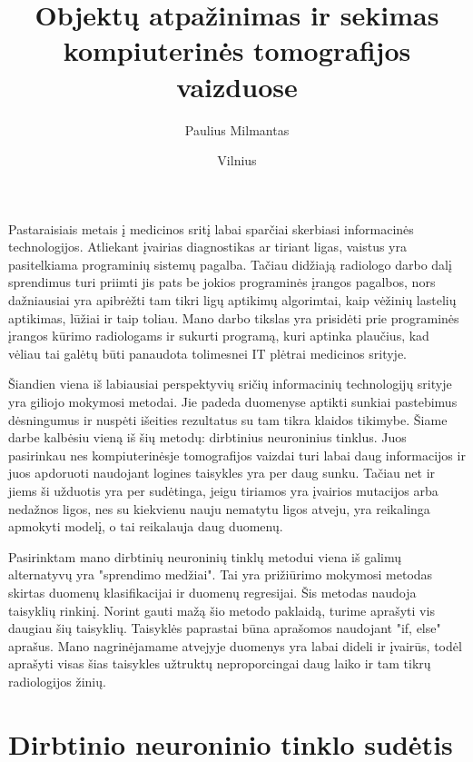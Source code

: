\documentclass{VUMIFInfKursinis}
\title{Objektų atpažinimas ir sekimas kompiuterinės tomografijos vaizduose}
\author{Paulius Milmantas}
\date{Vilnius \\ \the\year}
\begin{document}
\maketitle

Pastaraisiais metais į medicinos sritį labai sparčiai skerbiasi informacinės technologijos. Atliekant
įvairias diagnostikas ar tiriant ligas, vaistus yra pasitelkiama programinių sistemų pagalba. Tačiau
didžiają radiologo darbo dalį sprendimus turi priimti jis pats be jokios programinės įrangos pagalbos,
nors dažniausiai yra apibrėžti tam tikri ligų aptikimų algorimtai, kaip vėžinių lastelių aptikimas,
lūžiai ir taip toliau. Mano darbo tikslas yra prisidėti prie programinės įrangos kūrimo radiologams
ir sukurti programą, kuri aptinka plaučius, kad vėliau tai galėtų būti panaudota tolimesnei
IT plėtrai medicinos srityje.
\par
Šiandien viena iš labiausiai perspektyvių sričių informacinių technologijų srityje yra giliojo mokymosi
metodai.
Jie padeda duomenyse aptikti sunkiai pastebimus dėsningumus ir nuspėti išeities rezultatus su tam tikra klaidos tikimybe.
Šiame darbe kalbėsiu vieną iš šių metodų: dirbtinius neuroninius tinklus.
Juos pasirinkau nes kompiuterinėsje tomografijos vaizdai turi labai daug informacijos ir juos apdoruoti
naudojant logines taisykles yra per daug sunku. Tačiau net ir jiems ši užduotis yra per sudėtinga, jeigu
tiriamos yra įvairios mutacijos arba nedažnos ligos, nes su kiekvienu nauju nematytu ligos atveju,
yra reikalinga apmokyti modelį, o tai reikalauja daug duomenų.
\par
Pasirinktam mano dirbtinių neuroninių tinklų metodui viena iš galimų alternatyvų yra "sprendimo medžiai".
Tai yra prižiūrimo mokymosi metodas skirtas duomenų klasifikacijai ir duomenų regresijai. Šis metodas
naudoja taisyklių rinkinį. Norint gauti mažą šio metodo paklaidą, turime aprašyti vis daugiau šių taisyklių.
Taisyklės paprastai būna aprašomos naudojant "if, else" aprašus. Mano nagrinėjamame atvejyje duomenys
yra labai dideli ir įvairūs, todėl aprašyti visas šias taisykles užtruktų neproporcingai daug laiko ir tam
tikrų radiologijos žinių.

\tableofcontents

\section{Dirbtinio neuroninio tinklo sudėtis}
\end{document}
